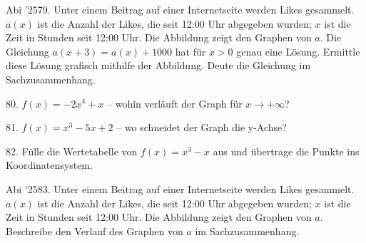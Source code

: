 \documentclass[11pt]{article}
\begin{document}
\pfgruppe{}
\begin{pfaufg}{Abi ’25}{79.}{}
Unter einem Beitrag auf einer Internetseite werden Likes gesammelt. $a(x)$ ist die Anzahl der Likes, die seit 12:00 Uhr abgegeben wurden; $x$ ist die Zeit in Stunden seit 12:00 Uhr. Die Abbildung zeigt den Graphen von $a$. Die Gleichung $a(x + 3) = a(x) + 1000$ hat für $x > 0$ genau eine Lösung. Ermittle diese Lösung grafisch mithilfe der Abbildung. Deute die Gleichung im Sachzusammenhang.
\par\smallskip\noindent {}\par
{}
\end{pfaufg}
\begin{pfaufg}{}{80.}{}
$f(x) = -2x^4 + x$ – wohin verläuft der Graph für $x \to +\infty$? 
\end{pfaufg}
\begin{pfaufg}{}{81.}{}
$f(x) = x^3 - 5x + 2$ – wo schneidet der Graph die y-Achse? 
\end{pfaufg}
\pfgruppe{}
\begin{pfaufg}{}{82.}{}
Fülle die Wertetabelle von $f(x) = x^3 - x$ aus und übertrage die Punkte ins Koordinatensystem.
\par\smallskip\noindent {}\begin{ksys}[xmin=-3,xmax=3,ymin=-7,ymax=7]\end{ksys}\par
\end{pfaufg}
\pfgruppe{}
\begin{pfaufg}{Abi ’25}{83.}{}
Unter einem Beitrag auf einer Internetseite werden Likes gesammelt. $a(x)$ ist die Anzahl der Likes, die seit 12:00 Uhr abgegeben wurden; $x$ ist die Zeit in Stunden seit 12:00 Uhr. Die Abbildung zeigt den Graphen von $a$. Beschreibe den Verlauf des Graphen von $a$ im Sachzusammenhang.
\par\smallskip\noindent {}\par
{}
\end{pfaufg}
\end{document}
